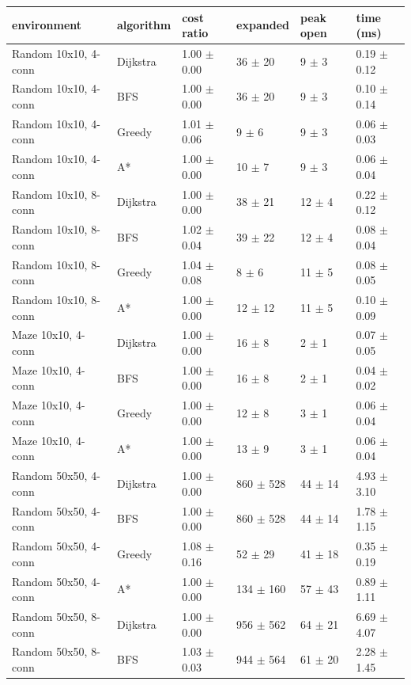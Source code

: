 \begin{tabular}{llllll}
\toprule
environment & algorithm & cost ratio & expanded & peak open & time (ms) \\
\midrule
Random 10x10, 4-conn & Dijkstra & 1.00 $\pm$ 0.00 & 36 $\pm$ 20 & 9 $\pm$ 3 & 0.19 $\pm$ 0.12 \\
Random 10x10, 4-conn & BFS & 1.00 $\pm$ 0.00 & 36 $\pm$ 20 & 9 $\pm$ 3 & 0.10 $\pm$ 0.14 \\
Random 10x10, 4-conn & Greedy & 1.01 $\pm$ 0.06 & 9 $\pm$ 6 & 9 $\pm$ 3 & 0.06 $\pm$ 0.03 \\
Random 10x10, 4-conn & A* & 1.00 $\pm$ 0.00 & 10 $\pm$ 7 & 9 $\pm$ 3 & 0.06 $\pm$ 0.04 \\
Random 10x10, 8-conn & Dijkstra & 1.00 $\pm$ 0.00 & 38 $\pm$ 21 & 12 $\pm$ 4 & 0.22 $\pm$ 0.12 \\
Random 10x10, 8-conn & BFS & 1.02 $\pm$ 0.04 & 39 $\pm$ 22 & 12 $\pm$ 4 & 0.08 $\pm$ 0.04 \\
Random 10x10, 8-conn & Greedy & 1.04 $\pm$ 0.08 & 8 $\pm$ 6 & 11 $\pm$ 5 & 0.08 $\pm$ 0.05 \\
Random 10x10, 8-conn & A* & 1.00 $\pm$ 0.00 & 12 $\pm$ 12 & 11 $\pm$ 5 & 0.10 $\pm$ 0.09 \\
Maze 10x10, 4-conn & Dijkstra & 1.00 $\pm$ 0.00 & 16 $\pm$ 8 & 2 $\pm$ 1 & 0.07 $\pm$ 0.05 \\
Maze 10x10, 4-conn & BFS & 1.00 $\pm$ 0.00 & 16 $\pm$ 8 & 2 $\pm$ 1 & 0.04 $\pm$ 0.02 \\
Maze 10x10, 4-conn & Greedy & 1.00 $\pm$ 0.00 & 12 $\pm$ 8 & 3 $\pm$ 1 & 0.06 $\pm$ 0.04 \\
Maze 10x10, 4-conn & A* & 1.00 $\pm$ 0.00 & 13 $\pm$ 9 & 3 $\pm$ 1 & 0.06 $\pm$ 0.04 \\
Random 50x50, 4-conn & Dijkstra & 1.00 $\pm$ 0.00 & 860 $\pm$ 528 & 44 $\pm$ 14 & 4.93 $\pm$ 3.10 \\
Random 50x50, 4-conn & BFS & 1.00 $\pm$ 0.00 & 860 $\pm$ 528 & 44 $\pm$ 14 & 1.78 $\pm$ 1.15 \\
Random 50x50, 4-conn & Greedy & 1.08 $\pm$ 0.16 & 52 $\pm$ 29 & 41 $\pm$ 18 & 0.35 $\pm$ 0.19 \\
Random 50x50, 4-conn & A* & 1.00 $\pm$ 0.00 & 134 $\pm$ 160 & 57 $\pm$ 43 & 0.89 $\pm$ 1.11 \\
Random 50x50, 8-conn & Dijkstra & 1.00 $\pm$ 0.00 & 956 $\pm$ 562 & 64 $\pm$ 21 & 6.69 $\pm$ 4.07 \\
Random 50x50, 8-conn & BFS & 1.03 $\pm$ 0.03 & 944 $\pm$ 564 & 61 $\pm$ 20 & 2.28 $\pm$ 1.45 \\

\end{tabular}
